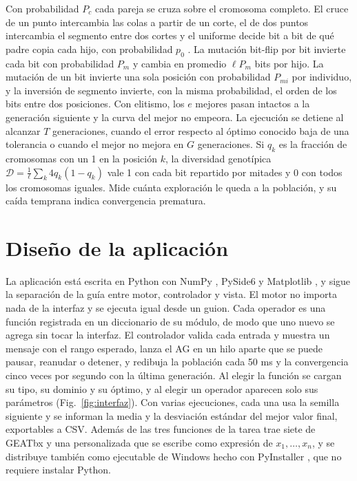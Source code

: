 \documentclass[conference]{IEEEtran}
\begin{document}
Con probabilidad $P_c$ cada pareja se cruza sobre el cromosoma completo. El cruce de un punto intercambia las colas a partir de un corte, el de dos puntos intercambia el segmento entre dos cortes y el uniforme decide bit a bit de qué padre copia cada hijo, con probabilidad $p_0$ \cite{syswerda1989}. La mutación bit-flip por bit invierte cada bit con probabilidad $P_m$ y cambia en promedio $\ell P_m$ bits por hijo. La mutación de un bit invierte una sola posición con probabilidad $P_{mi}$ por individuo, y la inversión de segmento invierte, con la misma probabilidad, el orden de los bits entre dos posiciones. Con elitismo, los $e$ mejores pasan intactos a la generación siguiente y la curva del mejor no empeora. La ejecución se detiene al alcanzar $T$ generaciones, cuando el error respecto al óptimo conocido baja de una tolerancia o cuando el mejor no mejora en $G$ generaciones. Si $q_k$ es la fracción de cromosomas con un 1 en la posición $k$, la diversidad genotípica $\mathcal{D}=\frac{1}{\ell}\sum_{k}4q_k(1-q_k)$ vale 1 con cada bit repartido por mitades y 0 con todos los cromosomas iguales. Mide cuánta exploración le queda a la población, y su caída temprana indica convergencia prematura.

\section{Diseño de la aplicación}

La aplicación está escrita en Python con NumPy \cite{harris2020}, PySide6 \cite{pyside6} y Matplotlib \cite{hunter2007}, y sigue la separación de la guía entre motor, controlador y vista. El motor no importa nada de la interfaz y se ejecuta igual desde un guion. Cada operador es una función registrada en un diccionario de su módulo, de modo que uno nuevo se agrega sin tocar la interfaz. El controlador valida cada entrada y muestra un mensaje con el rango esperado, lanza el AG en un hilo aparte que se puede pausar, reanudar o detener, y redibuja la población cada 50 ms y la convergencia cinco veces por segundo con la última generación. Al elegir la función se cargan su tipo, su dominio y su óptimo, y al elegir un operador aparecen solo sus parámetros (Fig.~\ref{fig:interfaz}). Con varias ejecuciones, cada una usa la semilla siguiente y se informan la media y la desviación estándar del mejor valor final, exportables a CSV. Además de las tres funciones de la tarea trae siete de GEATbx \cite{geatbx} y una personalizada que se escribe como expresión de $x_1,\dots,x_n$, y se distribuye también como ejecutable de Windows hecho con PyInstaller \cite{pyinstaller}, que no requiere instalar Python.
\end{document}
